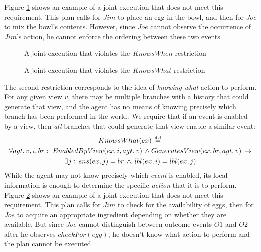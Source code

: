 Figure \ref{fig:not-knows-when} shows an example of a joint execution
that does not meet this requirement. This plan calls for $Jim$ to
place an egg in the bowl, and then for $Joe$ to mix the bowl's contents.
However, since $Joe$ cannot observe the occurrence of $Jim$'s action,
he cannot enforce the ordering between these two events.

%
\begin{figure}[!t]

\caption{A joint execution that violates the $KnowsWhen$ restriction}


\label{fig:not-knows-when} 
\end{figure}


%
\begin{figure}[!t]

\caption{A joint execution that violates the $KnowsWhat$ restriction}


\label{fig:not-knows-what} 
\end{figure}


The second restriction corresponds to the idea of \emph{knowing what}
action to perform. For any given view $v$, there may be multiple
branches with a history that could generate that view, and the agent
has no means of knowing precisely which branch has been performed in the
world. We require that if an event is enabled by a view, then \emph{all}
branches that could generate that view enable a similar event:\begin{multline*}
KnowsWhat(ex)\,\stackrel{\mbox{\tiny def}}{=}\,\\
\forall agt,v,i,br:\,\, EnabledByView(ex,i,agt,v)\,\wedge GeneratesView(ex,br,agt,v)\,\rightarrow\\
\exists j:\, ens(ex,j)=br\,\wedge\, lbl(ex,i)=lbl(ex,j)\end{multline*}
 While the agent may not know precisely which \emph{event} is enabled,
its local information is enough to determine the specific \emph{action}
that it is to perform. Figure \ref{fig:not-knows-what} shows an example
of a joint execution that does not meet this requirement. This plan
calls for $Jim$ to check for the availability of eggs, then for $Joe$
to acquire an appropriate ingredient depending on whether they are
available. But since $Joe$ cannot distinguish between outcome events
$O1$ and $O2$ after he observes $checkFor(egg)$, he doesn't know
what action to perform and the plan cannot be executed.

